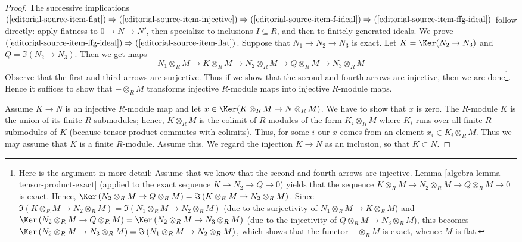 \begin{proof}
The successive implications
$(\ref{editorial-source-item-flat})\Rightarrow(\ref{editorial-source-item-injective})
\Rightarrow(\ref{editorial-source-item-f-ideal})\Rightarrow(\ref{editorial-source-item-ffg-ideal})$
follow directly: apply flatness to $0\to N\to N'$, then
specialize to inclusions $I\subseteq R$, and then to finitely
generated ideals. We prove
$(\ref{editorial-source-item-ffg-ideal})\Rightarrow(\ref{editorial-source-item-flat})$.
Suppose that $N_1 \to N_2 \to N_3$ is exact.
Let $K = \Ker(N_2 \to N_3)$ and $Q = \Im(N_2 \to N_3)$.
Then we get maps
$$
N_1 \otimes_R M \to
K \otimes_R M \to
N_2 \otimes_R M \to
Q \otimes_R M \to
N_3 \otimes_R M
$$
Observe that the first and third arrows are surjective. Thus if we show
that the second and fourth arrows are injective, then we are
done\footnote{Here is the argument in more detail:
Assume that we know that the second and fourth arrows are
injective. Lemma \ref{algebra-lemma-tensor-product-exact} (applied
to the exact sequence $K \to N_2 \to Q \to 0$) yields that
the sequence $K \otimes_R M \to N_2 \otimes_R M \to
Q \otimes_R M \to 0$ is exact. Hence,
$\Ker \left(N_2 \otimes_R M \to Q \otimes_R M\right)
= \Im \left(K \otimes_R M \to N_2 \otimes_R M\right)$.
Since
$\Im \left(K \otimes_R M \to N_2 \otimes_R M\right)
= \Im \left(N_1 \otimes_R M \to N_2 \otimes_R M\right)$
(due to the surjectivity of $N_1 \otimes_R M \to
K \otimes_R M$) and
$\Ker \left(N_2 \otimes_R M \to Q \otimes_R M\right)
= \Ker \left(N_2 \otimes_R M \to N_3 \otimes_R M\right)$
(due to the injectivity of $Q \otimes_R M \to
N_3 \otimes_R M$), this becomes
$\Ker \left(N_2 \otimes_R M \to N_3 \otimes_R M\right)
= \Im \left(N_1 \otimes_R M \to N_2 \otimes_R M\right)$,
which shows that the functor $- \otimes_R M$ is exact,
whence $M$ is flat.}.
Hence it suffices to show that $- \otimes_R M$ transforms
injective $R$-module maps into injective $R$-module maps.

\medskip\noindent
Assume $K \to N$ is an injective $R$-module map and
let $x \in \Ker(K \otimes_R M \to N \otimes_R M)$.
We have to show that $x$ is zero.
The $R$-module $K$ is the union of its finite
$R$-submodules; hence, $K \otimes_R M$ is
the colimit of $R$-modules of the form
$K_i \otimes_R M$ where $K_i$ runs over all finite
$R$-submodules of $K$
(because tensor product commutes with colimits).
Thus, for some $i$ our $x$ comes from an element
$x_i \in K_i \otimes_R M$. Thus we may assume that $K$
is a finite $R$-module. Assume this. We regard the
injection $K \to N$ as an inclusion, so that
$K \subset N$.


\end{proof}
